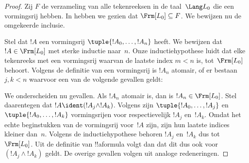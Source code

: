 \documentclass[openany]{memoir}
\begin{document}
\begin{proof}
Zij $F$ de verzameling van alle tekenreeksen in de taal~$\Lang L_0$
die een vormingsrij hebben. In 
hebben we gezien dat $\Frm[L_0] \subseteq F$. We bewijzen nu de
omgekeerde inclusie.

Stel dat $!A$ een vormingsrij $\tuple{!A_0,\dotsc,!A_n}$ heeft. We
bewijzen dat $!A \in \Frm[L_0]$ met sterke inductie naar~$n$. Onze
inductiehypothese luidt dat elke tekenreeks met een vormingsrij waarvan
de laatste index $m < n$ is, tot~$\Frm[L_0]$ behoort. Volgens de
definitie van een vormingsrij is $!A_n$ atomair, of er bestaan
$j,k < n$ waarvoor een van de volgende gevallen geldt:
\begin{enumerate}
\end{enumerate}
We onderscheiden nu gevallen. Als $!A_n$ atomair is, dan is
$!A_n \in \Frm[L_0]$. Stel daarentegen dat $!A \ident
(!A_j \land !A_k)$. Volgens  zijn
$\tuple{!A_0,\dotsc,!A_j}$ en $\tuple{!A_0,\dotsc,!A_k}$ vormingsrijen
voor respectievelijk $!A_j$ en~$!A_k$. Omdat het echte beginstukken
van de vormingsrij voor~$!A$ zijn, zijn hun laatste indices kleiner
dan~$n$. Volgens de inductiehypothese behoren $!A_j$ en~$!A_k$ dus
  tot~$\Frm[L_0]$. Uit de definitie van !!a{formula} volgt dan dat dit
  dus ook voor $(!A_j \land !A_k)$ geldt. De overige gevallen
volgen uit analoge redeneringen.
\end{proof}
\endgroup

\begingroup
\def\olfilename{OLP-0061}
\def\olfilepath{content/propositional-logic/syntax-and-semantics/}
\hypertarget{unit-OLP-0061}{}



\end{document}
